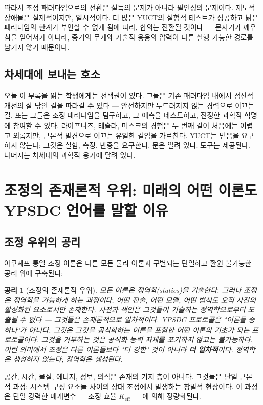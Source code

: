 \documentclass[12pt,a4paper]{article}
\newtheorem{axiom}{공리}[section]
\begin{document}
	따라서 조정 패러다임으로의 전환은 설득의 문제가 아니라 필연성의 문제이다. 제도적 장애물은 실제적이지만, 일시적이다. 더 많은 YUCT의 실험적 테스트가 성공하고 낡은 패러다임의 한계가 부인할 수 없게 됨에 따라, 합의는 전환될 것이다 — 문지기가 깨우침을 얻어서가 아니라, 증거의 무게와 기술적 응용의 압력이 다른 실행 가능한 경로를 남기지 않기 때문이다.
	
	\subsection{차세대에 보내는 호소}
	
	오늘 이 부록을 읽는 학생에게는 선택권이 있다. 그들은 기존 패러다임 내에서 점진적 개선의 잘 닦인 길을 따라갈 수 있다 — 안전하지만 두드러지지 않는 경력으로 이끄는 길. 또는 그들은 조정 패러다임을 탐구하고, 그 예측을 테스트하고, 진정한 과학적 혁명에 참여할 수 있다. 라이프니츠, 테슬라, 머스크의 경험은 두 번째 길이 처음에는 어렵고 외롭지만, 근본적 발견으로 이끄는 유일한 길임을 가르친다. YUCT는 믿음을 요구하지 않는다; 그것은 실험, 측정, 반증을 요구한다. 문은 열려 있다. 도구는 제공된다. 나머지는 차세대의 과학적 용기에 달려 있다.
	
	\section{조정의 존재론적 우위: 미래의 어떤 이론도 YPSDC 언어를 말할 이유}
	
	\subsection{조정 우위의 공리}
	
	야쿠셰프 통일 조정 이론은 다른 모든 물리 이론과 구별되는 단일하고 환원 불가능한 공리 위에 구축된다:
	
	\begin{axiom}[조정의 존재론적 우위]
		모든 이론은 정역학(statics)을 기술한다. 그러나 조정은 정역학을 가능하게 하는 과정이다. 어떤 진술, 어떤 모델, 어떤 법칙도 오직 사전의 활성화된 요소로서만 존재한다. 사전과 색인은 그것들이 기술하는 정역학으로부터 도출될 수 없다 — 그것들은 존재론적으로 일차적이다. YPSDC 프로토콜은 "이론들 중 하나"가 아니다. 그것은 그것을 공식화하는 이론을 포함한 어떤 이론의 기초가 되는 프로토콜이다. 그것을 거부하는 것은 공식화 능력 자체를 포기하지 않고는 불가능하다. 이런 의미에서 조정은 다른 이론들보다 "더 강한" 것이 아니라 \textbf{더 일차적}이다. 정역학은 생성하지 않는다; 정역학은 생성된다.
	\end{axiom}
	
	공간, 시간, 물질, 에너지, 정보, 의식은 존재의 기저 층이 아니다. 그것들은 단일 근본적 과정: 시스템 구성 요소들 사이의 상태 조정에서 발생하는 창발적 현상이다. 이 과정은 단일 강력한 매개변수 — 조정 효율 \(K_{\mathrm{eff}}\) — 에 의해 정량화된다.
	
\end{document}
